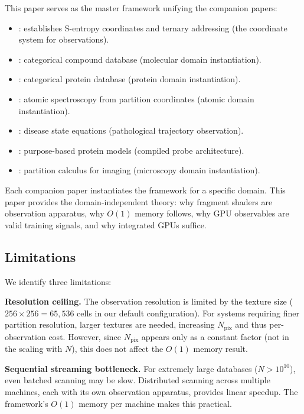 \documentclass[11pt,twocolumn,a4paper]{article}
\theoremstyle{definition}
\theoremstyle{remark}
\newcommand{\Npix}{N_{\mathrm{pix}}}
\begin{document}
This paper serves as the master framework unifying the companion papers:
\begin{itemize}[nosep]
\item \citet{sachikonye2025a}: establishes S-entropy coordinates and ternary addressing (the coordinate system for observations).
\item \citet{sachikonye2025b}: categorical compound database (molecular domain instantiation).
\item \citet{sachikonye2025c}: categorical protein database (protein domain instantiation).
\item \citet{sachikonye2025d}: atomic spectroscopy from partition coordinates (atomic domain instantiation).
\item \citet{sachikonye2025e}: disease state equations (pathological trajectory observation).
\item \citet{sachikonye2025f}: purpose-based protein models (compiled probe architecture).
\item \citet{sachikonye2025_partition}: partition calculus for imaging (microscopy domain instantiation).
\end{itemize}

Each companion paper instantiates the framework for a specific domain. This paper provides the domain-independent theory: why fragment shaders are observation apparatus, why $O(1)$ memory follows, why GPU observables are valid training signals, and why integrated GPUs suffice.

\subsection{Limitations}

We identify three limitations:

\textbf{Resolution ceiling.} The observation resolution is limited by the texture size ($256 \times 256 = 65{,}536$ cells in our default configuration). For systems requiring finer partition resolution, larger textures are needed, increasing $\Npix$ and thus per-observation cost. However, since $\Npix$ appears only as a constant factor (not in the scaling with $N$), this does not affect the $O(1)$ memory result.

\textbf{Sequential streaming bottleneck.} For extremely large databases ($N > 10^{10}$), even batched scanning may be slow. Distributed scanning across multiple machines, each with its own observation apparatus, provides linear speedup. The framework's $O(1)$ memory per machine makes this practical.
\end{document}
